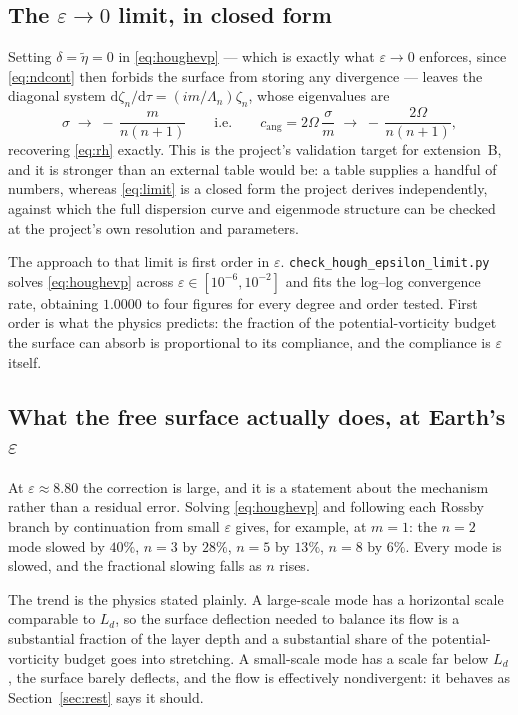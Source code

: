 \documentclass[11pt,a4paper]{article}
\newcommand{\file}[1]{\texttt{\nolinkurl{#1}}}
\newcommand{\dd}{\mathrm{d}}
\begin{document}
\subsection{The $\varepsilon\to0$ limit, in closed form}
\label{sec:hough:limit}

Setting $\delta = \tilde\eta = 0$ in \eqref{eq:houghevp} --- which is exactly
what $\varepsilon\to0$ enforces, since \eqref{eq:ndcont} then forbids the surface
from storing any divergence --- leaves the diagonal system
$\dd\zeta_n/\dd\tau = (im/\Lambda_n)\zeta_n$, whose eigenvalues are
%
\begin{equation}
\sigma \;\longrightarrow\; -\,\frac{m}{n(n+1)}
\qquad\text{i.e.}\qquad
c_{\mathrm{ang}} = 2\Omega\,\frac{\sigma}{m}
 \;\longrightarrow\; -\,\frac{2\Omega}{n(n+1)} ,
\label{eq:limit}
\end{equation}
%
recovering \eqref{eq:rh} exactly. This is the project's validation target for
extension~B, and it is stronger than an external table would be: a table
supplies a handful of numbers, whereas \eqref{eq:limit} is a closed form the
project derives independently, against which the full dispersion curve and
eigenmode structure can be checked at the project's own resolution and
parameters.

The approach to that limit is first order in $\varepsilon$.
\file{check_hough_epsilon_limit.py} solves \eqref{eq:houghevp} across
$\varepsilon \in [10^{-6}, 10^{-2}]$ and fits the log--log convergence rate,
obtaining $1.0000$ to four figures for every degree and order tested. First
order is what the physics predicts: the fraction of the potential-vorticity
budget the surface can absorb is proportional to its compliance, and the
compliance is $\varepsilon$ itself.

\subsection{What the free surface actually does, at Earth's $\varepsilon$}

At $\varepsilon \approx 8.80$ the correction is large, and it is a statement
about the mechanism rather than a residual error. Solving \eqref{eq:houghevp}
and following each Rossby branch by continuation from small $\varepsilon$ gives,
for example, at $m=1$: the $n=2$ mode slowed by $40\%$, $n=3$ by $28\%$, $n=5$
by $13\%$, $n=8$ by $6\%$. Every mode is slowed, and the fractional slowing
falls as $n$ rises.

The trend is the physics stated plainly. A large-scale mode has a horizontal
scale comparable to $L_d$, so the surface deflection needed to balance its flow
is a substantial fraction of the layer depth and a substantial share of the
potential-vorticity budget goes into stretching. A small-scale mode has a scale
far below $L_d$, the surface barely deflects, and the flow is effectively
nondivergent: it behaves as Section~\ref{sec:rest} says it should.
\end{document}
